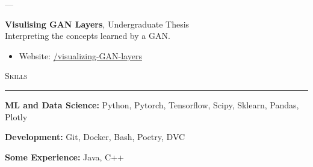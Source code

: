 \documentclass[a4paper]{article}
\newcommand{\entry}[6]{
    \begin{minipage}[t]{.05\textwidth}
        \centering #1
    \end{minipage}
    ---
    \begin{minipage}[t]{.05\textwidth}
        \centering #2
    \end{minipage}
    \hfill
    \begin{minipage}[t]{.85\textwidth}
        \textbf{#3}, #4\\
        #5\\
        \vspace{-1em}
        #6
    \end{minipage}
}
\begin{document}
\entry{2018}{}{Visulising GAN Layers}{Undergraduate Thesis}{Interpreting the concepts learned by a GAN.}{
    \begin{itemize}[leftmargin=*]
        \item Website: \href{https://github.com/Dan-Andrei-Iliescu/visualizing-GAN-layers}{/visualizing-GAN-layers}
    \end{itemize}
}

\vspace{1em}

\textsc{\Large Skills}

\rule{\textwidth}{1pt}

\textbf{ML and Data Science:} Python, Pytorch, Tensorflow, Scipy, Sklearn, Pandas, Plotly 

\textbf{Development:} Git, Docker, Bash, Poetry, DVC

\textbf{Some Experience:} Java, C++
\end{document}
